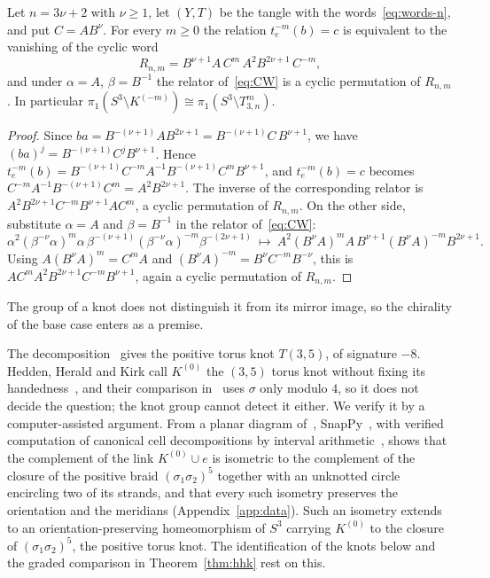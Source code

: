 \begin{lemma}\label{lem:relator}
Let $n=3\nu+2$ with $\nu\ge1$, let $(Y,T)$ be the tangle with the words~\eqref{eq:words-n}, and put $C=AB^\nu$. For every
$m\ge0$ the relation $t_e^{-m}(b)=c$ is equivalent to the vanishing of the cyclic word
\[
R_{n,m}=B^{\nu+1}A\,C^m\,A^2B^{2\nu+1}\,C^{-m},
\]
and under $\alpha=A$, $\beta=B^{-1}$ the relator of~\eqref{eq:CW} is a cyclic permutation of $R_{n,m}$. In particular
$\pi_1(S^3\setminus K^{(-m)})\cong\pi_1(S^3\setminus T^m_{3,n})$.
\end{lemma}

\begin{proof}
Since $ba=B^{-(\nu+1)}AB^{2\nu+1}=B^{-(\nu+1)}C\,B^{\nu+1}$, we have $(ba)^j=B^{-(\nu+1)}C^jB^{\nu+1}$. Hence
$t_e^{-m}(b)=B^{-(\nu+1)}C^{-m}A^{-1}B^{-(\nu+1)}C^mB^{\nu+1}$, and $t_e^{-m}(b)=c$ becomes
$C^{-m}A^{-1}B^{-(\nu+1)}C^m=A^2B^{2\nu+1}$. The inverse of the corresponding relator is
$A^2B^{2\nu+1}C^{-m}B^{\nu+1}AC^m$, a cyclic permutation of $R_{n,m}$. On the other side, substitute $\alpha=A$ and
$\beta=B^{-1}$ in the relator of~\eqref{eq:CW}:
\[
\alpha^2(\beta^{-\nu}\alpha)^m\alpha\,\beta^{-(\nu+1)}(\beta^{-\nu}\alpha)^{-m}\beta^{-(2\nu+1)}\ \longmapsto\ A^2(B^\nu A)^mA\,B^{\nu+1}(B^\nu A)^{-m}B^{2\nu+1}.
\] Using $A(B^\nu A)^m=C^mA$ and $(B^\nu A)^{-m}=B^\nu C^{-m}B^{-\nu}$, this is
$AC^mA^2B^{2\nu+1}C^{-m}B^{\nu+1}$, again a cyclic permutation of $R_{n,m}$.
\end{proof}

The group of a knot does not distinguish it from its mirror image, so the chirality of the base case enters as a
premise.

\begin{remark}\label{rem:chirality}
The decomposition~\cite[(17)]{HHK2} gives the positive torus knot $T(3,5)$, of signature $-8$. Hedden, Herald and Kirk
call $K^{(0)}$ the $(3,5)$ torus knot without fixing its handedness~\cite[\S10]{HHK2}, and their comparison
in~\cite[\S11]{HHK2} uses $\sigma$ only modulo $4$, so it does not decide the question; the knot group cannot detect it
either. We verify it by a computer-assisted argument. From a planar diagram of~\cite[Fig.~18]{HHK2}, SnapPy~\cite{SnapPy},
with verified computation of canonical cell decompositions by interval arithmetic~\cite{HIKMOT,DHL}, shows that the
complement of the link $K^{(0)}\cup e$ is isometric to the complement of the closure of the positive braid
$(\sigma_1\sigma_2)^5$ together with an unknotted circle encircling two of its strands, and that every such isometry
preserves the orientation and the meridians (Appendix~\ref{app:data}). Such an isometry extends to an
orientation-preserving homeomorphism of $S^3$ carrying $K^{(0)}$ to the closure of $(\sigma_1\sigma_2)^5$, the positive torus
knot. The identification of the knots below and the graded comparison in Theorem~\ref{thm:hhk} rest on this.
\end{remark}

